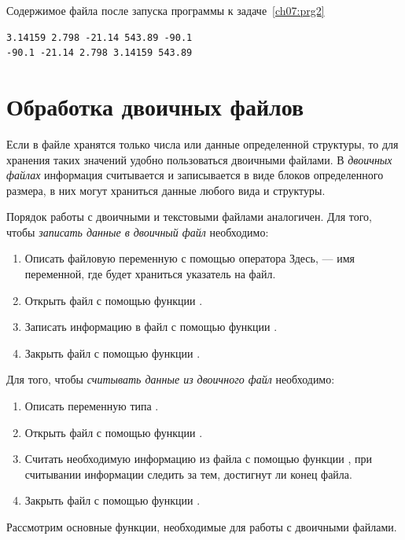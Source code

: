 Содержимое файла  после запуска программы к задаче~\ref{ch07:prg2}
\begin{verbatim}
3.14159 2.798 -21.14 543.89 -90.1
-90.1 -21.14 2.798 3.14159 543.89
\end{verbatim}


\section[Обработка двоичных файлов]{Обработка двоичных файлов}
Если в файле хранятся только числа или данные определенной структуры, то для хранения таких значений удобно пользоваться
двоичными файлами. В \emph{двоичных файлах} информация считывается и записывается в
виде блоков определенного размера, в них могут храниться данные любого вида и структуры.

Порядок работы с двоичными и текстовыми файлами аналогичен. Для того, чтобы
\emph{записать данные в двоичный файл} необходимо:

\begin{enumerate}
\item Описать файловую переменную с помощью оператора
Здесь,  --- имя переменной, где будет храниться указатель на файл.
\item Открыть файл с помощью функции .
\item Записать информацию в файл с помощью функции .
\item Закрыть файл с помощью функции .
\end{enumerate}
Для того, чтобы \emph{считывать данные из двоичного файл} необходимо:

\begin{enumerate}
\item Описать переменную типа .
\item Открыть файл с помощью функции .
\item Считать необходимую информацию из файла с помощью функции , при считывании информации
следить за тем, достигнут ли конец файла.
\item Закрыть файл с помощью функции .
\end{enumerate}
Рассмотрим основные функции, необходимые для работы с двоичными файлами.

